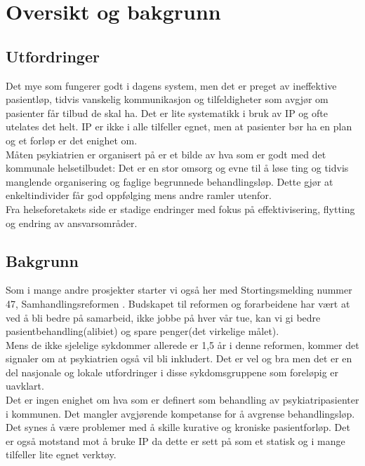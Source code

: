 \documentclass[11pt]{report} %
\begin{document}
              \renewcommand{\chaptername}{Del}
              \tableofcontents

              \chapter{Oversikt og bakgrunn}\label{chap:ov}
                \section{Utfordringer}\label{sec:ov_utf}
                  Det mye som fungerer godt i dagens system, men det er preget av ineffektive pasientløp, tidvis vanskelig kommunikasjon og tilfeldigheter som avgjør om pasienter får tilbud de skal ha. Det er lite systematikk i bruk av IP og ofte utelates det helt. IP er ikke i alle tilfeller egnet, men at pasienter bør ha en plan og et forløp er det enighet om. \\
                  Måten psykiatrien er organisert på er et bilde av hva som er godt med det kommunale helsetilbudet: Det er en stor omsorg og evne til å løse ting og tidvis manglende organisering og faglige begrunnede behandlingsløp\label{stor_vilje_til_hjelp}. Dette gjør at enkeltindivider får god oppfølging mens andre ramler utenfor. \\
                  Fra helseforetakets side er stadige endringer med fokus på effektivisering, flytting og endring av ansvarsområder.\\

                \section{Bakgrunn}\label{sec:ov_bakg}
                  Som i mange andre prosjekter starter vi også her med Stortingsmelding nummer 47, Samhandlingsreformen
                  \cite{Stmld47}. Budskapet til reformen og forarbeidene har vært at ved å bli bedre på samarbeid, ikke jobbe på hver vår tue, kan vi gi bedre pasientbehandling(alibiet) og spare penger(det virkelige målet). \\
                  Mens de ikke sjelelige sykdommer allerede er 1,5 år i denne reformen, kommer det signaler om at psykiatrien også vil bli inkludert. Det er vel og bra men det er en del nasjonale og lokale utfordringer i disse sykdomsgruppene som foreløpig er uavklart. \\
                  Det er ingen enighet om hva som er definert som behandling av psykiatripasienter i kommunen. Det mangler avgjørende kompetanse for å avgrense behandlingsløp. Det synes å være problemer med å skille kurative og kroniske pasientforløp. Det er også motstand mot å bruke IP da dette er sett på som et statisk og i mange tilfeller lite egnet verktøy. \\
\end{document}
